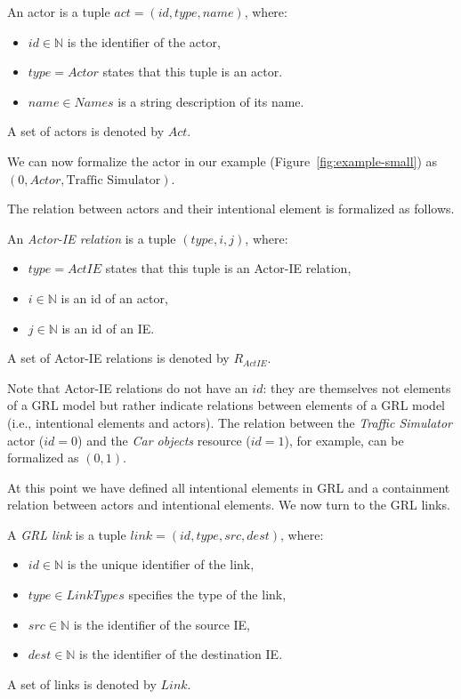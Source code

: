 \begin{definition}[Actor]
\label{def:actor}
An actor is a tuple $act=(id,type, name)$, where:
\begin{itemize}
\item $id\in\mathbb{N}$ is the identifier of the actor, 
\item $type = Actor$ states that this tuple is an actor.
\item $name\in Names$ is a string description of its name.
\end{itemize}
A set of actors is denoted by $Act$.
\end{definition}
We can now formalize the actor in our example (Figure~\ref{fig:example-small}) as $(0,Actor,\text{Traffic Simulator})$.%

The relation between actors and their intentional element is formalized as follows. 

\begin{definition}
\label{def:act-ie-relation}
An \emph{Actor-IE relation} is a tuple $(type, i, j)$, where:
\begin{itemize}
\item $type = ActIE$ states that this tuple is an Actor-IE relation,
\item $i\in\mathbb{N}$ is an id of an actor,
\item $j\in\mathbb{N}$ is an id of an IE.
\end{itemize}

A set of Actor-IE relations is denoted by $R_{ActIE}$.
\end{definition}

Note that Actor-IE relations do not have an $id$: they are themselves not elements of a GRL model but rather indicate relations between elements of a GRL model (i.e., intentional elements and actors). The relation between the \emph{Traffic Simulator} actor ($id = 0$) and the \emph{Car objects} resource ($id=1$), for example, can be formalized as $(0, 1)$.

At this point we have defined all intentional elements in GRL and a containment relation between actors and intentional elements. We now turn to the GRL links.

\begin{definition}
\label{def:link}
A \emph{GRL link} is a tuple $link = (id,type,src,dest)$, where:
\begin{itemize}
\item $id\in \mathbb{N}$ is the unique identifier of the link,
\item $type\in LinkTypes$ specifies the type of the link, 
\item $src\in \mathbb{N}$ is the identifier of the source IE,
\item $dest\in \mathbb{N}$ is the identifier of the destination IE.
\end{itemize}

A set of links is denoted by $Link$.
\end{definition}

